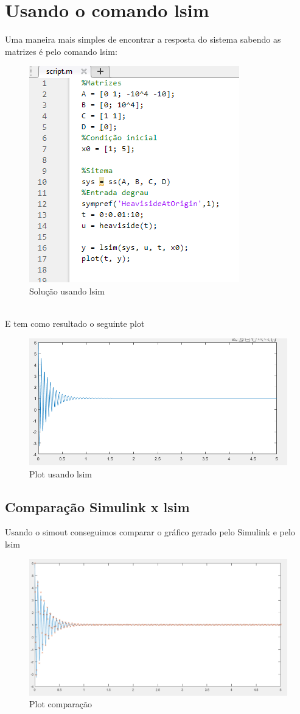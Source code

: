 \documentclass[a4paper, 12pt]{article}
\begin{document}
\section{Usando o comando lsim}
	Uma maneira mais simples de encontrar a resposta do sistema sabendo as matrizes é pelo comando lsim:
	\begin{figure}[h]
		\centering
		\includegraphics[scale=0.7]{imagens/a8.png}
		\caption{Solução usando lsim}
	\end{figure}\\
	\newpage
	E tem como resultado o seguinte plot
	\begin{figure}[h]
		\centering
		\includegraphics[scale=0.7]{imagens/a9.png}
		\caption{Plot usando lsim}
	\end{figure}
	\subsection{Comparação Simulink x lsim}
		Usando o simout conseguimos comparar o gráfico gerado pelo Simulink e pelo lsim
		\begin{figure}[h]
			\centering
			\includegraphics[scale=0.5]{imagens/a10.png}
			\caption{Plot comparação}
		\end{figure}
	
	
	
	
\end{document}
